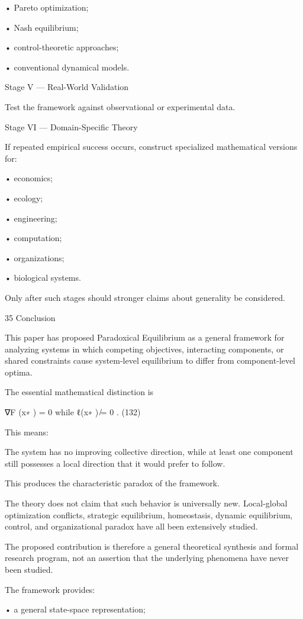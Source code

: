 \documentclass[10pt,a4paper]{article}
\begin{document}
\begin{ManuscriptText}
  • Pareto optimization;

  • Nash equilibrium;

  • control-theoretic approaches;

  • conventional dynamical models.


Stage V — Real-World Validation

Test the framework against observational or experimental data.


Stage VI — Domain-Specific Theory

If repeated empirical success occurs, construct specialized mathematical versions for:

  • economics;

  • ecology;

  • engineering;

  • computation;

  • organizations;

  • biological systems.

Only after such stages should stronger claims about generality be considered.


35     Conclusion

This paper has proposed Paradoxical Equilibrium as a general framework for analyzing systems
in which competing objectives, interacting components, or shared constraints cause system-level
equilibrium to differ from component-level optima.

The essential mathematical distinction is


                                ∇F (x∗ ) = 0     while   ℓ(x∗ ) ̸= 0 .                       (132)

This means:

     The system has no improving collective direction, while at least one component still
      possesses a local direction that it would prefer to follow.

This produces the characteristic paradox of the framework.

The theory does not claim that such behavior is universally new. Local-global optimization
conflicts, strategic equilibrium, homeostasis, dynamic equilibrium, control, and organizational
paradox have all been extensively studied.

The proposed contribution is therefore a general theoretical synthesis and formal research program,
not an assertion that the underlying phenomena have never been studied.

The framework provides:

  • a general state-space representation;


\end{ManuscriptText}
\end{document}

